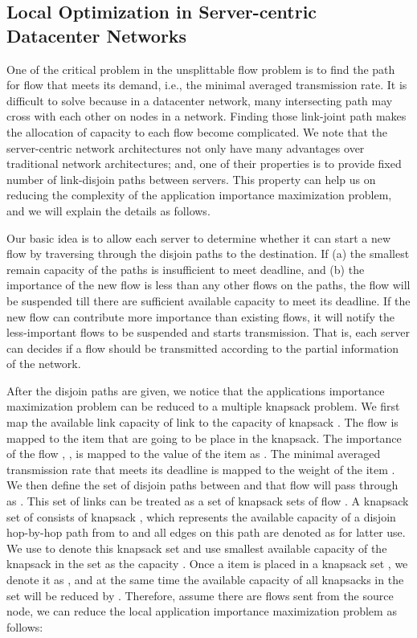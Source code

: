 \documentclass[conference]{IEEEtran}
\begin{document}
\subsection{Local Optimization in Server-centric Datacenter Networks}

One of the critical problem in the unsplittable flow problem is to find the path for flow  that meets its demand, i.e., the minimal averaged transmission rate. It is difficult to solve because in a datacenter network, many intersecting path may cross with each other on nodes in a network. Finding those link-joint path makes the allocation of capacity to each flow become complicated. We note that the server-centric network architectures not only have many advantages over traditional network architectures; and, one of their properties is to provide fixed number of link-disjoin paths between servers. This property can help us on reducing the complexity of the application importance maximization problem, and we will explain the details as follows.

Our basic idea is to allow each server to determine whether it can start a new flow by traversing through the disjoin paths to the destination. If (a) the smallest remain capacity of the paths is insufficient to meet deadline, and (b) the importance of the new flow is less than any other flows on the paths, the flow will be suspended till there are sufficient available capacity to meet its deadline. If the new flow can contribute more importance than existing flows, it will notify the less-important flows to be suspended and starts transmission. That is, each server can decides if a flow should be transmitted according to the partial information of the network.

After the disjoin paths are given, we notice that the applications importance maximization problem can be reduced to a multiple knapsack problem. We first map the available link capacity  of link  to the capacity of knapsack . The flow  is mapped to the item  that are going to be place in the knapsack. The importance of the flow , , is mapped to the value of the item as . The minimal averaged transmission rate  that meets its deadline is mapped to the weight of the item . We then define the set of disjoin paths between  and  that flow  will pass through as . This set of links  can be treated as a set of knapsack sets  of flow . A knapsack set of  consists of knapsack , which represents the available capacity of a disjoin hop-by-hop path from  to  and all edges on this path are denoted as  for latter use. We use  to denote this knapsack set and use smallest available capacity of the knapsack in the set as the capacity . Once a item  is placed in a knapsack set , we denote it as , and at the same time the available capacity of all knapsacks in the set will be reduced by . Therefore, assume there are  flows sent from the source node, we can reduce the local application importance maximization problem as follows:
\end{document}
